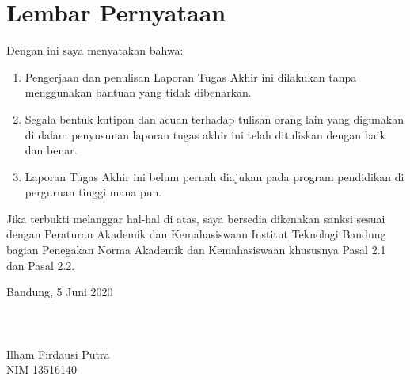 \clearpage

\chapter*{Lembar Pernyataan}

Dengan ini saya menyatakan bahwa:

\begin{enumerate}

    \item Pengerjaan dan penulisan Laporan Tugas Akhir ini dilakukan tanpa menggunakan bantuan yang tidak dibenarkan.
    \item Segala bentuk kutipan dan acuan terhadap tulisan orang lain yang digunakan di dalam penyusunan laporan tugas akhir ini telah dituliskan dengan baik dan benar.
    \item Laporan Tugas Akhir ini belum pernah diajukan pada program pendidikan di perguruan tinggi mana pun.

\end{enumerate}

Jika terbukti melanggar hal-hal di atas, saya bersedia dikenakan sanksi sesuai dengan Peraturan Akademik dan Kemahasiswaan Institut Teknologi Bandung bagian Penegakan Norma Akademik dan Kemahasiswaan khususnya Pasal 2.1 dan Pasal 2.2.
\vspace{15mm}

Bandung, 5 Juni 2020 \\
\\
\\
\\
Ilham Firdausi Putra \\
NIM 13516140

\clearpage